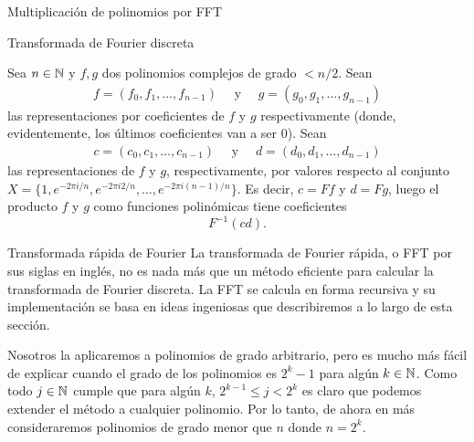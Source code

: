 \begin{chapter}{Multiplicación de polinomios por FFT}
\begin{section}{Transformada de Fourier discreta}
\begin{ejemplo*}
        Sea $n \in \mathbb N$ y $f, g$ dos polinomios complejos de grado $< n/2$. Sean
        \begin{align*}
            f = (f_0, f_1, \ldots, f_{n-1}) \quad \text{ y } \quad g = (g_0, g_1, \ldots, g_{n-1})
        \end{align*}
        las representaciones por coeficientes de $f$ y $g$ respectivamente (donde, evidentemente, los últimos coeficientes van a ser $0$). Sean
        \begin{align*}
            c = (c_0, c_1, \ldots, c_{n-1}) \quad \text{ y } \quad d = (d_0, d_1, \ldots, d_{n-1})
        \end{align*}
        las representaciones de $f$ y $g$, respectivamente, por valores respecto al conjunto $X = \{1, e^{-2\pi i /{n}},e^{-2\pi i 2/{n}}, \ldots,e^{-2\pi i {(n-1)}/{n}} \}$. Es decir, $c = Ff$ y $d = Fg$,  luego el producto $f$ y $g$ como funciones polinómicas tiene coeficientes
        \begin{equation*}
             F^{-1}(cd).
        \end{equation*}
        \begin{comment}
        Observar que el hecho de que $F$ sea invertible y  que al aplicar transformada discreta de Fourier a un polinomio se obtiene una representación por valores del mismo, junto al teorema \ref{th-prod-convolucion-dft}, hacen que no sea necesario utilizar la proposición \ref{prop-mult-por-valor} para calcular el producto de dos polinomios utilizando la representación por valores.
        \end{comment}
    \end{ejemplo*}

 \end{section}

 \begin{section}{Transformada rápida de Fourier} La transformada de Fourier rápida, o FFT por sus siglas en inglés, no es nada más que un método eficiente para calcular la transformada de Fourier discreta. La FFT se calcula en forma recursiva y su implementación se basa en ideas ingeniosas que describiremos a lo largo de esta sección.

    Nosotros la aplicaremos a polinomios de grado arbitrario, pero es mucho más fácil de explicar cuando el grado de los polinomios es $2^k -1$  para algún $k \in \mathbb N$. Como todo $j \in \mathbb N$ cumple que para algún $k$, $2^{k-1} \le j < 2^k$ es claro que podemos extender el método a cualquier polinomio. Por lo tanto, de ahora en más consideraremos polinomios de grado menor que $n$ donde  $n = 2^k$.


\end{section}
\end{chapter}
